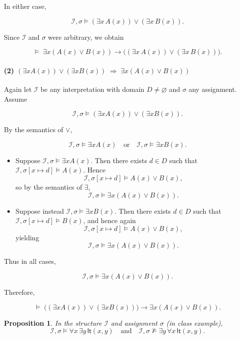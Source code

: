 \documentclass{article}
\theoremstyle{plain}
\newtheorem{proposition}{Proposition}
\theoremstyle{definition}
\theoremstyle{remark}
\begin{document}
In either case, 

\[
\mathcal{I},\sigma \vDash (\exists x\,A(x)) \lor (\exists x\,B(x)).
\]

Since $\mathcal{I}$ and $\sigma$ were arbitrary, we obtain

\[
\models\; \exists x(A(x)\lor B(x)) 
\to \bigl((\exists x\,A(x))\lor(\exists x\,B(x))\bigr).
\]

\paragraph{(2) $(\exists xA(x))\lor(\exists xB(x)) \;\Rightarrow\; \exists x(A(x)\lor B(x))$}

Again let $\mathcal{I}$ be any interpretation with domain $D\neq\varnothing$
and $\sigma$ any assignment.  
Assume

\[
\mathcal{I},\sigma \vDash (\exists xA(x))\lor(\exists xB(x)).
\]

By the semantics of $\lor$,

\[
\mathcal{I},\sigma \vDash \exists xA(x)
\quad\text{or}\quad
\mathcal{I},\sigma \vDash \exists xB(x).
\]

\begin{itemize}
    \item Suppose $\mathcal{I},\sigma \vDash \exists xA(x)$.  
    Then there exists $d\in D$ such that
    $\mathcal{I},\sigma[x\mapsto d] \vDash A(x)$.
    Hence
    \[
       \mathcal{I},\sigma[x\mapsto d] \vDash A(x)\lor B(x),
    \]
    so by the semantics of $\exists$,
    \[
       \mathcal{I},\sigma \vDash \exists x(A(x)\lor B(x)).
    \]

    \item Suppose instead $\mathcal{I},\sigma \vDash \exists xB(x)$.  
    Then there exists $d\in D$ such that
    $\mathcal{I},\sigma[x\mapsto d] \vDash B(x)$, and hence again
    \[
       \mathcal{I},\sigma[x\mapsto d] \vDash A(x)\lor B(x),
    \]
    yielding
    \[
       \mathcal{I},\sigma \vDash \exists x(A(x)\lor B(x)).
    \]
\end{itemize}

Thus in all cases,

\[
\mathcal{I},\sigma \vDash \exists x(A(x)\lor B(x)).
\]

Therefore,

\[
\models\; 
\bigl((\exists xA(x))\lor(\exists xB(x))\bigr)
\to \exists x(A(x)\lor B(x)).
\]
\newpage
\begin{proposition}
In the structure $\mathcal I$ and assignment $\sigma$ (in class example),
\[
\mathcal I,\sigma \vDash \forall x\,\exists y\,\mathsf{lt}(x,y)
\quad\text{and}\quad
\mathcal I,\sigma \nvDash \exists y\,\forall x\,\mathsf{lt}(x,y).
\]
\end{proposition}
\end{document}
